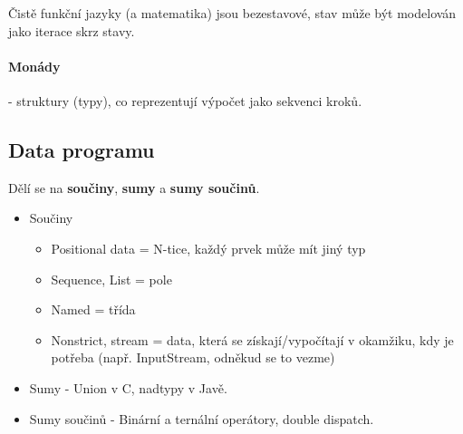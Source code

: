 Čistě funkční jazyky (a matematika) jsou bezestavové, stav může být modelován jako iterace skrz stavy.

\paragraph{Monády} - struktury (typy), co reprezentují výpočet jako sekvenci kroků.

\subsection{Data programu}
Dělí se na \textbf{součiny}, \textbf{sumy} a \textbf{sumy součinů}.

\begin{itemize}[itemsep=0px]
\item Součiny
\begin{itemize}[itemsep=0px]
\item Positional data = N-tice, každý prvek může mít jiný typ
\item Sequence, List = pole
\item Named = třída
\item Nonstrict, stream = data, která se získají/vypočítají v okamžiku, kdy je potřeba (např. InputStream, odněkud se to vezme)
\end{itemize}

\item Sumy - Union v C, nadtypy v Javě.
\item Sumy součinů - Binární a ternální operátory, double dispatch.
\end{itemize}
